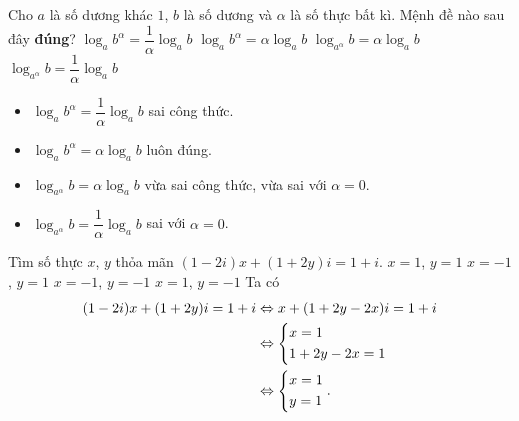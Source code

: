 \begin{ex}%
	Cho $a$ là số dương khác $1$, $b$ là số dương và $\alpha$ là số thực bất kì. Mệnh đề nào sau đây \textbf{đúng}?
	\choice
	{$\log_a b^{\alpha} = \dfrac{1}{\alpha} \log_a b$}
	{\True $\log_a b^{\alpha} = \alpha \log_a b$}
	{$\log_{a^{\alpha}} b = \alpha \log_a b$}
	{$\log_{a^{\alpha}} b =\dfrac{1}{\alpha} \log_a b$}
	\loigiai
	{
		\begin{itemize}
			\item $\log_a b^{\alpha} = \dfrac{1}{\alpha} \log_a b$ sai công thức.
			\item $\log_a b^{\alpha} = \alpha \log_a b$ luôn đúng.
			\item $\log_{a^{\alpha}} b = \alpha \log_a b$ vừa sai công thức, vừa sai với $\alpha=0$.
			\item $\log_{a^{\alpha}} b =\dfrac{1}{\alpha} \log_a b$ sai với $\alpha = 0$.
		\end{itemize}
	}
\end{ex}
\begin{ex}%
	Tìm số thực $x$, $y$ thỏa mãn $(1 - 2i ) x + ( 1 + 2y ) i = 1 + i$.
	\choice
	{\True $x=1$, $y=1$}
	{$x=-1$, $y=1$}
	{$x=-1$, $y=-1$}
	{$x=1$, $y=-1$}
	\loigiai
	{
		Ta có $$\begin{aligned}
		(1-2i)x+(1+2y)i=1+i &\Leftrightarrow x+(1+2y-2x)i=1+i\\
		&\Leftrightarrow \left\{\begin{aligned}&x=1\\&1+2y-2x=1\\\end{aligned}\right.\\
		&\Leftrightarrow \left\{\begin{aligned}&x=1\\&y=1\\\end{aligned}\right..
		\end{aligned}$$
	}
\end{ex}

